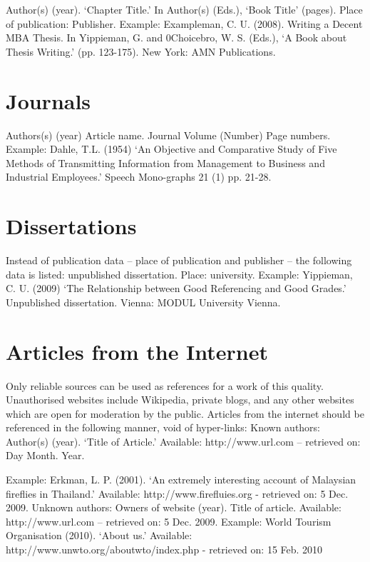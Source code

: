 Author(s) (year). ‘Chapter Title.’ In Author(s) (Eds.), ‘Book Title’ (pages). Place of publication: Publisher.
Example:
Exampleman, C. U. (2008). Writing a Decent MBA Thesis. In Yippieman, G. and 0Choicebro, W. S. (Eds.), ‘A Book about Thesis Writing.’ (pp. 123-175). New York: AMN Publications. 

\section{Journals}
\label{sec:journals}

Authors(s) (year) Article name. Journal Volume (Number) Page numbers. 
Example:
Dahle, T.L. (1954) ‘An Objective and Comparative Study of Five Methods of Transmitting Information from Management to Business and Industrial Employees.’ Speech Mono-graphs 21 (1) pp. 21-28.



\section{Dissertations}
\label{sec:phd}

Instead of publication data – place of publication and publisher – the following data is listed: unpublished dissertation. Place: university.
Example: 
Yippieman, C. U. (2009) ‘The Relationship between Good Referencing and Good Grades.’ Unpublished dissertation. Vienna: MODUL University Vienna. 



\section{Articles from the Internet}
\label{sec:internetarticles}

Only reliable sources can be used as references for a work of this quality. Unauthorised websites include Wikipedia, private blogs, and any other websites which are open for moderation by the public.
Articles from the internet should be referenced in the following manner, void of hyper-links: 
Known authors:
Author(s) (year). ‘Title of Article.’ Available: http://www.url.com – retrieved on: 
Day Month. Year. 

Example:
Erkman, L. P. (2001). ‘An extremely interesting account of Malaysian fireflies in Thailand.’ Available: http://www.firefluies.org - retrieved on: 5 Dec. 2009.
Unknown authors:
Owners of website (year). Title of article. Available: 
http://www.url.com – retrieved on: 5 Dec. 2009.
Example:
World Tourism Organisation (2010). ‘About us.’ Available: http://www.unwto.org/aboutwto/index.php - retrieved on: 15 Feb. 2010


